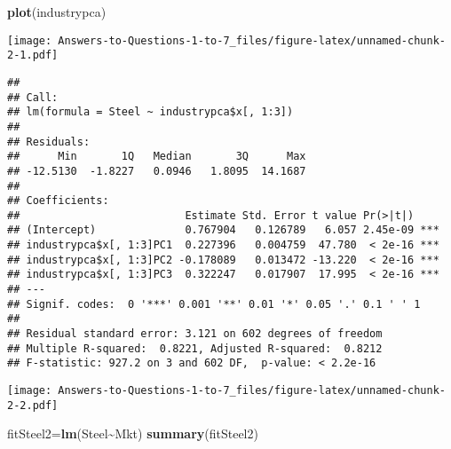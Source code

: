 \documentclass[
]{article}
\newenvironment{Shaded}{\begin{snugshade}}{\end{snugshade}}
\newcommand{\CommentTok}[1]{\textcolor[rgb]{0.56,0.35,0.01}{\textit{#1}}}
\newcommand{\DecValTok}[1]{\textcolor[rgb]{0.00,0.00,0.81}{#1}}
\newcommand{\FunctionTok}[1]{\textcolor[rgb]{0.13,0.29,0.53}{\textbf{#1}}}
\newcommand{\NormalTok}[1]{#1}
\newcommand{\OtherTok}[1]{\textcolor[rgb]{0.56,0.35,0.01}{#1}}
\newcommand{\SpecialCharTok}[1]{\textcolor[rgb]{0.81,0.36,0.00}{\textbf{#1}}}
\begin{document}
\begin{Shaded}
\begin{Highlighting}[]
\FunctionTok{plot}\NormalTok{(industrypca)}
\end{Highlighting}
\end{Shaded}

\texttt{[image: Answers-to-Questions-1-to-7\_files/figure-latex/unnamed-chunk-2-1.pdf]}

\begin{Shaded}
\end{Shaded}

\begin{verbatim}
## 
## Call:
## lm(formula = Steel ~ industrypca$x[, 1:3])
## 
## Residuals:
##      Min       1Q   Median       3Q      Max 
## -12.5130  -1.8227   0.0946   1.8095  14.1687 
## 
## Coefficients:
##                          Estimate Std. Error t value Pr(>|t|)    
## (Intercept)              0.767904   0.126789   6.057 2.45e-09 ***
## industrypca$x[, 1:3]PC1  0.227396   0.004759  47.780  < 2e-16 ***
## industrypca$x[, 1:3]PC2 -0.178089   0.013472 -13.220  < 2e-16 ***
## industrypca$x[, 1:3]PC3  0.322247   0.017907  17.995  < 2e-16 ***
## ---
## Signif. codes:  0 '***' 0.001 '**' 0.01 '*' 0.05 '.' 0.1 ' ' 1
## 
## Residual standard error: 3.121 on 602 degrees of freedom
## Multiple R-squared:  0.8221, Adjusted R-squared:  0.8212 
## F-statistic: 927.2 on 3 and 602 DF,  p-value: < 2.2e-16
\end{verbatim}

\begin{Shaded}
\end{Shaded}

\texttt{[image: Answers-to-Questions-1-to-7\_files/figure-latex/unnamed-chunk-2-2.pdf]}

\begin{Shaded}
\begin{Highlighting}[]
\NormalTok{fitSteel2}\OtherTok{=}\FunctionTok{lm}\NormalTok{(Steel}\SpecialCharTok{\textasciitilde{}}\NormalTok{Mkt)}
\FunctionTok{summary}\NormalTok{(fitSteel2)}
\end{Highlighting}
\end{Shaded}
\end{document}
